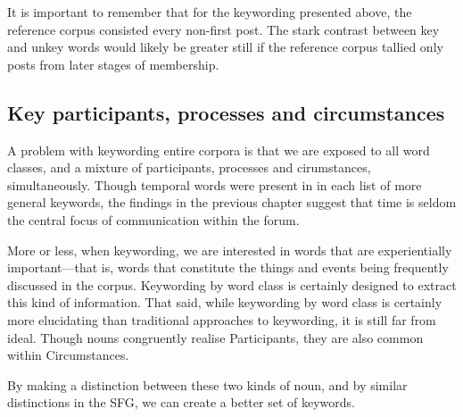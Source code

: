 

It is important to remember that for the keywording presented above, the reference corpus consisted every non-first post. The stark contrast between key and unkey words would likely be greater still if the reference corpus tallied only posts from later stages of membership.

    \subsection{Key participants, processes and circumstances}

    A problem with keywording entire corpora is that we are exposed to all word classes, and a mixture of participants, processes and cirumstances, simultaneously. Though temporal words were present in in each list of more general keywords, the findings in the previous chapter suggest that time is seldom the central focus of communication within the forum.

More or less, when keywording, we are interested in words that are experientially important---that is, words that constitute the things and events being frequently discussed in the corpus. Keywording by word class is certainly designed to extract this kind of information. That said, while keywording by word class is certainly more elucidating than traditional approaches to keywording, it is still far from ideal. Though nouns congruently realise Participants, they are also common within Circumstances.


By making a distinction between these two kinds of noun, and by similar distinctions in the SFG, we can create a better set of keywords.

